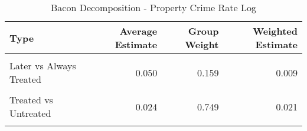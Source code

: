 \begin{table}[H]

\caption{\label{tab:tab:bacondecompositionProperty}Bacon Decomposition - Property Crime Rate Log}
\centering
\begin{tabular}[t]{lrrr}
\toprule
Type & Average Estimate & Group Weight & Weighted Estimate\\
\midrule
\cellcolor{gray!6}{Earlier vs Later Treated} & \cellcolor{gray!6}{0.004} & \cellcolor{gray!6}{0.068} & \cellcolor{gray!6}{-0.001}\\
Later vs Always Treated & 0.050 & 0.159 & 0.009\\
\cellcolor{gray!6}{Later vs Earlier Treated} & \cellcolor{gray!6}{0.049} & \cellcolor{gray!6}{0.023} & \cellcolor{gray!6}{0.000}\\
Treated vs Untreated & 0.024 & 0.749 & 0.021\\
\cellcolor{gray!6}{Total TWFE} & \cellcolor{gray!6}{NaN} & \cellcolor{gray!6}{NaN} & \cellcolor{gray!6}{0.029}\\
\bottomrule
\end{tabular}
\end{table}
